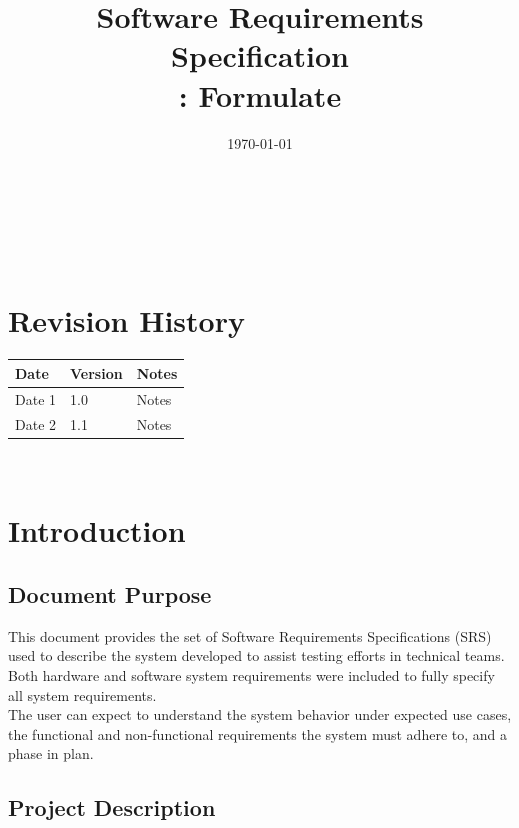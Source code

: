 \documentclass[12pt]{article}
\begin{document}
\title{Software Requirements Specification \\ \progname: Formulate} 

\author{\authname}
\date{\today}
	
\maketitle

~\newpage


\tableofcontents

~\newpage

\section*{Revision History}

\begin{tabularx}{\textwidth}{p{3cm}p{2cm}X}
\toprule {\bf Date} & {\bf Version} & {\bf Notes}\\
\midrule
Date 1 & 1.0 & Notes\\
Date 2 & 1.1 & Notes\\
\bottomrule
\end{tabularx}

~\newpage

\section{Introduction}

\subsection{Document Purpose}

This document provides the set of Software Requirements Specifications (SRS) used to describe the system developed to assist testing efforts in technical teams. Both hardware and software system requirements were included to fully specify all system requirements. \\

The user can expect to understand the system behavior under expected use cases, the functional and non-functional requirements the system must adhere to, and a phase in plan.\\

\subsection{Project Description}
\end{document}
